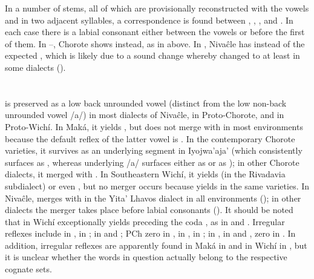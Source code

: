 In a number of stems, all of which are provisionally reconstructed with the vowels  and  in two adjacent syllables, a correspondence is found between , , , and . In each case there is a labial consonant either between the vowels or before the first of them. In --, Chorote shows  instead, as in  above. In , Nivaĉle has  instead of the expected , which is likely due to a sound change whereby  changed to  at least in some dialects ().

\begin{exe}
    \ex \flower \label{a-flower}
    \ex \shoulder \label{a-shoulder}
    \ex \shoulderblade \label{a-shoulderblade}
    \ex \paloflojof
    \ex \paloflojot
    \ex \spring
\end{exe}

\section{}\label{pm-ao}
 is preserved as a low back unrounded vowel (distinct from the low non-back unrounded vowel /a/) in most dialects of Nivaĉle, in Proto-Chorote, and in Proto-Wichí. In Maká, it yields , but does not merge with  in most environments because the default reflex of the latter vowel is . In the contemporary Chorote varieties, it survives as an underlying segment in Iyojwa’aja’ (which consistently surfaces as , whereas underlying /a/ surfaces either as  or as ); in other Chorote dialects, it merged with . In Southeastern Wichí, it yields  (in the Rivadavia subdialect) or even , but no merger occurs because  yields  in the same varieties. In Nivaĉle,  merges with  in the Yita’ Lhavos dialect in all environments (); in other dialects the merger takes place before labial consonants (). It should be noted that in Wichí  exceptionally yields  preceding the coda , as in  and . Irregular reflexes include  in ,  in ;  in  and ; PCh zero in ,  in ,  in ;  in ,  in  and , zero in . In addition, irregular reflexes are apparently found in Maká in  and in Wichí in , but it is unclear whether the words in question actually belong to the respective cognate sets.


